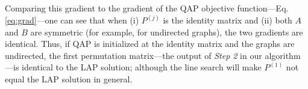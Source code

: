 \documentclass[10pt,journal,cspaper,compsoc]{IEEEtran}
\newcommand{\PmcP}{P \in \mc{P}}
\begin{document}
Comparing this gradient to the gradient of the QAP objective function---Eq. \eqref{eq:grad}---one can see that when (i) $P^{(j)}$ is the identity matrix and (ii) both $A$ and $B$ are symmetric (for example, for undirected graphs), the two gradients are identical.  Thus, if QAP is initialized at the identity matrix and the graphs are undirected, the first permutation matrix---the output of \emph{Step 2} in our \qap algorithm---is identical to the LAP solution; although the line search will make $P^{(1)}$ not equal the LAP solution in general. %

\end{document}
